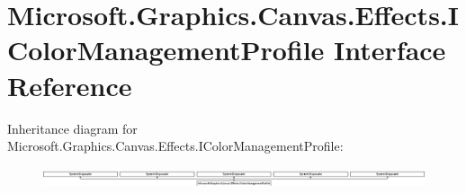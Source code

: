 \hypertarget{interface_microsoft_1_1_graphics_1_1_canvas_1_1_effects_1_1_i_color_management_profile}{}\section{Microsoft.\+Graphics.\+Canvas.\+Effects.\+I\+Color\+Management\+Profile Interface Reference}
\label{interface_microsoft_1_1_graphics_1_1_canvas_1_1_effects_1_1_i_color_management_profile}
Inheritance diagram for Microsoft.\+Graphics.\+Canvas.\+Effects.\+I\+Color\+Management\+Profile\+:\begin{figure}[H]
\begin{center}
\leavevmode
\includegraphics[height=0.613699cm]{interface_microsoft_1_1_graphics_1_1_canvas_1_1_effects_1_1_i_color_management_profile}
\end{center}
\end{figure}

